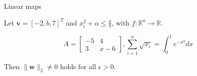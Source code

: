 Linear maps

Let \(\mathbf{v} = [-2, b, 7]^T\) and \(x_i^2 + \alpha \leq \frac{a}{b}\), with \(f : \mathbb{R}^n \to \mathbb{R}\).

\[
A = \begin{bmatrix}
-5 & 4 \\
3 & x - 6
\end{bmatrix}, \sum_{i=1}^n \sqrt{x_i} = \int_0^1 e^{-x^2} dx
\]

Then \(\|\mathbf{w}\|_2 \neq 0\) holds for all \(\epsilon > 0\).
